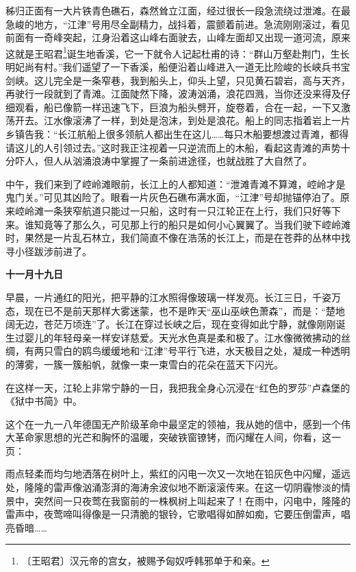 \documentclass[12pt,UTF-8,openany]{ctexbook}
\begin{document}
\begin{normalsize}
    秭归正面有一大片铁青色礁石，森然耸立江面，经过很长一段急流绕过泄滩。在最急峻的地方，“江津”号用尽全副精力，战抖着，震颤着前进。急流刚刚滚过，看见前面有一奇峰突起，江身沿着这山峰右面驶去，山峰左面却又出现一道河流，原来这就是王昭君\footnote{〔王昭君〕汉元帝的宫女，被赐予匈奴呼韩邪单于和亲。}诞生地香溪，它一下就令人记起杜甫的诗：“群山万壑赴荆门，生长明妃尚有村。”我们遥望了一下香溪，船便沿着山峰进入一道无比险峻的长峡兵书宝剑峡。这儿完全是一条窄巷，我到船头上，仰头上望，只见黄石碧岩，高与天齐，再驶行一段就到了青滩。江面陡然下降，波涛汹涌，浪花四溅，当你还没来得及仔细观看，船已像箭一样迅速飞下，巨浪为船头劈开，旋卷着，合在一起，一下又激荡开去。江水像滚沸了一样，到处是泡沫，到处是浪花。船上的同志指着岩上一片乡镇告我：“长江航船上很多领航人都出生在这儿……每只木船要想渡过青滩，都得请这儿的人引领过去。”这时我正注视着一只逆流而上的木船，看起这青滩的声势十分吓人，但人从汹涌浪涛中掌握了一条前进途径，也就战胜了大自然了。
    
    中午，我们来到了崆岭滩眼前，长江上的人都知道：“泄滩青滩不算滩，崆岭才是鬼门关。”可见其凶险了。眼看一片灰色石礁布满水面，“江津”号却抛锚停泊了。原来崆岭滩一条狭窄航道只能过一只船，这时有一只江轮正在上行，我们只好等下来。谁知竟等了那么久，可见那上行的船只是如何小心翼翼了。当我们驶下崆岭滩时，果然是一片乱石林立，我们简直不像在浩荡的长江上，而是在苍莽的丛林中找寻小径跋涉前进了。
    
    \textbf{十一月十九日}
    
    早晨，一片通红的阳光，把平静的江水照得像玻璃一样发亮。长江三日，千姿万态，现在已不是前天那样大雾迷蒙，也不是昨天“巫山巫峡色萧森”，而是：“楚地阔无边，苍茫万顷连”了。长江在穿过长峡之后，现在变得如此宁静，就像刚刚诞生过婴儿的年轻母亲一样安详慈爱。天光水色真是柔和极了。江水像微微拂动的丝绸，有两只雪白的鸥鸟缓缓地和“江津”号平行飞进，水天极目之处，凝成一种透明的薄雾，一簇一簇船帆，就像一束一束雪白的花朵在蓝天下闪光。
    
    在这样一天，江轮上非常宁静的一日，我把我全身心沉浸在“红色的罗莎”卢森堡的《狱中书简》中。
    
    这个在一九一八年德国无产阶级革命中最坚定的领袖，我从她的信中，感到一个伟大革命家思想的光芒和胸怀的温暖，突破铁窗镣铐，而闪耀在人间，你看，这一页：
    
    雨点轻柔而均匀地洒落在树叶上，紫红的闪电一次又一次地在铅灰色中闪耀，遥远处，隆隆的雷声像汹涌澎湃的海涛余波似地不断滚滚传来。在这一切阴霾惨淡的情景中，突然间一只夜莺在我窗前的一株枫树上叫起来了！在雨中，闪电中，隆隆的雷声中，夜莺啼叫得像是一只清脆的银铃，它歌唱得如醉如痴，它要压倒雷声，唱亮昏暗……
    

\end{normalsize}
\end{document}
